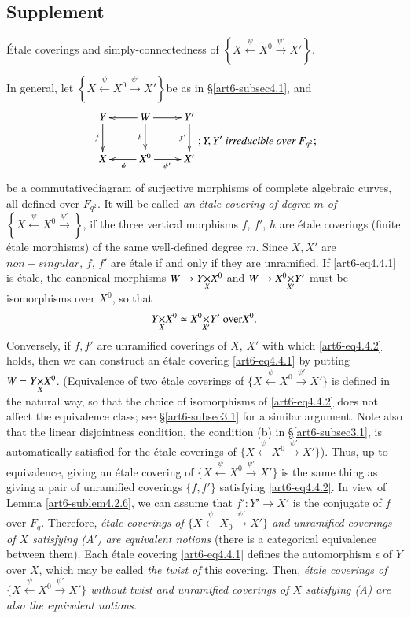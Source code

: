 \subsection{Supplement}\label{sec6-subsec4.4}
\'Etale coverings and simply-connectedness of $\left\{X \xleftarrow{\psi} X^0 \xrightarrow{\psi'} X' \right\}$.

In general, let $\left\{X \xleftarrow{\psi} X^0 \xrightarrow{\psi'} X' \right\}$be as in \S \ref{art6-subsec4.1}, and
\setcounter{equation}{0}
\begin{equation}
\vcenter{
\xymatrix{
Y \ar[d]_-f & W\ar[d]_-h\ar[r]\ar[l] & Y'\ar[d]_-{f'}\\
X & X^0 \ar[r]_{\psi'} \ar[l]^{\psi} & X'
} }
; Y, Y' \textit{ irreducible over } F_{q^2};
\label{art6-eq4.4.1}
\end{equation}
be a commutative\pageoriginale diagram of surjective morphisms of complete algebraic curves, all defined over $F_{q^2}$. It will be called \textit{an \'etale covering of degree $m$ of}  $\left\{X \xleftarrow{\psi} X^0 \xrightarrow{\psi'} \right\}$, if the three vertical morphisms $f$, $f'$, $h$ are \'etale coverings (finite \'etale morphisms) of the same well-defined degree $m$. Since $X, X'$ are $non-singular$, $f$, $f'$ are \'etale if and only if they are unramified. If \eqref{art6-eq4.4.1} is \'etale, the canonical morphisms $W \to \fprod{Y}{X^0}{X}$ and $W \to \fprod{X^0}{Y'}{X'}$ must be isomorphisms over $X^0$, so that 
\begin{equation}
\fprod{Y}{X^0}{X} \simeq \fprod{X^0}{Y'}{X'} \text{ over} X^0. 
\label{art6-eq4.4.2}
\end{equation}
Conversely, if $f, f'$ are unramified coverings of $X$, $X'$ with which \eqref{art6-eq4.4.2} holds, then we can construct an \'etale covering \eqref{art6-eq4.4.1} by putting $W = \fprod{Y}{X^0}{X}$. (Equivalence of two \'etale coverings of $\{ X \xleftarrow{\psi} X^0 \xrightarrow{\psi'} X'\}$ is defined in the natural way, so that the choice of isomorphisms of \eqref{art6-eq4.4.2} does not affect the equivalence class; see \S \ref{art6-subsec3.1} for a similar argument. Note also that the linear disjointness condition, the condition (b) in \S \ref{art6-subsec3.1}, is automatically satisfied for the \'etale coverings of $\{X \xleftarrow{\psi} X^0 \xrightarrow{\psi'} X'\}$). Thus, up to equivalence, giving an \'etale covering of $\{X \xleftarrow{\psi} X^0 \xrightarrow{\psi'} X'\}$ is the same thing as giving a pair of unramified coverings $\{f, f'\}$ satisfying \eqref{art6-eq4.4.2}. In view of Lemma \ref{art6-sublem4.2.6}, we can assume that $f': Y' \to X'$ is the conjugate of $f$ over $F_q$. Therefore, \textit{\'etale coverings of $\{X \xleftarrow{\psi} X_0 \xrightarrow{\psi'}X'\}$ and unramified coverings of $X$ satisfying (A$'$) are equivalent notions} (there is a categorical equivalence between them). Each \'etale covering \eqref{art6-eq4.4.1} defines the automorphism $\epsilon$ of $Y$ over $X$, which may be called \textit{the twist of}  this covering. Then, \textit{\'etale coverings of $\{X \xleftarrow{\psi} X^0\xrightarrow{\psi'} X'\}$ without twist and unramified coverings of $X$ satisfying (A) are also the equivalent notions.} 

